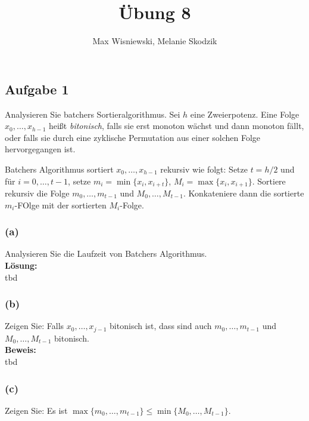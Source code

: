 \documentclass[11pt,a4paper,ngerman]{article}
\date{}
\title{Übung 8}
\author{Max Wisniewski, Melanie Skodzik}
\begin{document}

\renewcommand{\figurename}{Grafik}

\maketitle
\thispagestyle{fancy}


\subsection*{Aufgabe 1}
Analysieren Sie batchers Sortieralgorithmus. Sei $h$ eine Zweierpotenz. Eine Folge $x_0, \ldots, x_{h-1}$ heißt \emph{bitonisch}, falls sie erst
monoton wächst und dann monoton fällt, oder falls sie durch eine zyklische Permutation aus einer solchen Folge hervorgegangen ist.

Batchers Algorithmus sortiert $x_0, \ldots, x_{h-1}$ rekursiv wie folgt: Setze $t = h / 2$ und für $i = 0, \ldots , t-1$, setze $m_i= \min \{x_i, x_{i+t}\}$, $M_i = \max \{x_i, x_{i+1} \}$. Sortiere rekursiv die Folge $m_0,\ldots, m_{t-1}$ und $M_0, \ldots, M_{t-1}$. Konkateniere dann die sortierte $m_i$-FOlge mit der sortierten $M_i$-Folge.

\subsubsection*{(a)}
Analysieren Sie die Laufzeit von Batchers Algorithmus.\\

\noindent\textbf{Lösung:}\\

tbd

\subsubsection*{(b)}
Zeigen Sie: Falls $x_0, \ldots, x_{j-1}$ bitonisch ist, dass sind auch $m_0, \ldots, m_{t-1}$ und $M_0, \ldots, M_{t-1}$ bitonisch.\\

\noindent\textbf{Beweis:}\\

tbd

\subsubsection*{(c)}
Zeigen Sie: Es ist $\max \{ m_0 , \ldots, m_{t-1}\} \leq \min \{ M_0, \ldots, M_{t-1}\}$.\\
\end{document}
